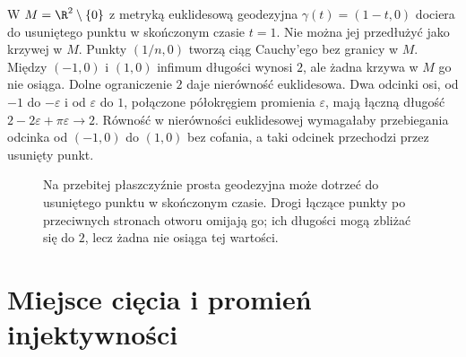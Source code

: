 \begin{przyklad}
W $M=\R^2\setminus\{0\}$ z metryką euklidesową
geodezyjna $\gamma(t)=(1-t,0)$ dociera do
usuniętego punktu w skończonym czasie $t=1$.
Nie można jej przedłużyć jako krzywej w $M$.
Punkty $(1/n,0)$ tworzą ciąg Cauchy'ego bez
granicy w $M$. Między $(-1,0)$ i $(1,0)$
infimum długości wynosi $2$, ale żadna krzywa
w $M$ go nie osiąga. Dolne ograniczenie $2$ daje
nierówność euklidesowa. Dwa odcinki osi, od $-1$ do
$-\varepsilon$ i od $\varepsilon$ do $1$, połączone
półokręgiem promienia $\varepsilon$, mają łączną długość
$2-2\varepsilon+\pi\varepsilon\to2$.
Równość w nierówności euklidesowej wymagałaby przebiegania
odcinka od $(-1,0)$ do $(1,0)$ bez cofania, a taki odcinek
przechodzi przez usunięty punkt.
\end{przyklad}

\begin{figure}[htbp]
\centering
{}
\caption{Na przebitej płaszczyźnie prosta geodezyjna może dotrzeć do usuniętego punktu w skończonym czasie. Drogi łączące punkty po przeciwnych stronach otworu omijają go; ich długości mogą zbliżać się do $2$, lecz żadna nie osiąga tej wartości.}
\label{fig:geodezyjna-przebita-plaszczyzna}
\end{figure}

\section{Miejsce cięcia i promień injektywności}
\label{sec:geodezyjne-miejsce-ciecia}


